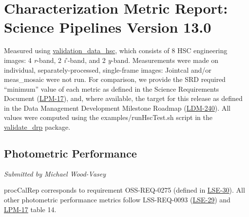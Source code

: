 \section{Characterization Metric Report: Science Pipelines Version
13.0}\label{characterization-metric-report-science-pipelines-version-13.0}

Measured using
\href{https://github.com/lsst/validation_data_hsc}{validation\_data\_hsc},
which consists of 8 HSC engineering images: 4 \emph{r}-band, 2
\emph{i}'-band, and 2 \emph{y}-band. Measurements were made on
individual, separately-processed, single-frame images: Jointcal and/or
meas\_mosaic were not run. For comparison, we provide the SRD required
``minimum'' value of each metric as defined in the Science Requirements
Document (\href{http://ls.st/lpm-17}{LPM-17}), and, where available, the
target for this release as defined in the Data Management Development
Milestone Roadmap (\href{http://ls.st/ldm-240}{LDM-240}). All values
were computed using the examples/runHscTest.sh script in the
\href{https://github.com/lsst/validate_drp}{validate\_drp} package.

\subsection{Photometric Performance}\label{photometric-performance}

\emph{Submitted by Michael Wood-Vasey}

procCalRep corresponds to requirement OSS-REQ-0275 (defined in
\href{http://ls.st/lse-30}{LSE-30}). All other photometric performance
metrics follow LSS-REQ-0093 (\href{http://ls.st/lse-29}{LSE-29}) and
\href{http://ls.st/lpm-17}{LPM-17} table 14.

